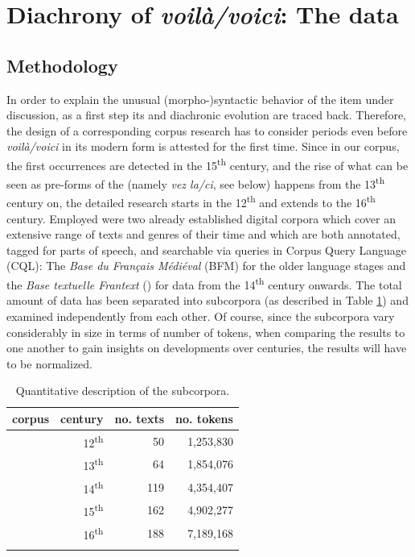 \documentclass[output=paper,colorlinks,citecolor=brown]{langscibook}
\begin{document}
\section{Diachrony of \emph{voilà/voici}: The data} \label{07sec2}

\subsection{Methodology}

In order to explain the unusual (morpho-)syntactic behavior of the item under discussion, as a first step its  and diachronic evolution are traced back. Therefore, the design of a corresponding corpus research has to consider periods even before \emph{voilà/voici} in its modern form is attested for the first time. Since in our corpus, the first occurrences are detected in the 15\textsuperscript{th} century, and the rise of what can be seen as pre-forms of the  (namely \emph{vez la/ci}, see below) happens from the 13\textsuperscript{th} century on, the detailed research starts in the 12\textsuperscript{th} and extends to the 16\textsuperscript{th} century. Employed were two already established digital corpora which cover an extensive range of texts and genres of their time and which are both annotated, tagged for parts of speech, and searchable via queries in Corpus Query Language (CQL): The \emph{Base du Français Médiéval} (BFM) for the older language stages and the \emph{Base textuelle Frantext} (\citeauthor{frantext}) for data from the 14\textsuperscript{th} century onwards. The total amount of data has been separated into subcorpora (as described in Table \ref{07tab1}) and examined independently from each other. Of course, since the subcorpora vary considerably in size in terms of number of tokens, when comparing the results to one another to gain insights on developments over centuries, the results will have to be normalized.

\begin{table}[ht]
	\centering
	\begin{tabularx}{0.6\textwidth}{Xrrr}
		\lsptoprule
			corpus\is{corpus linguistics} & century & no. texts & no. tokens \\
			\midrule
			\cite{bfm2019} & 12\textsuperscript{th} & 50 & 1,253,830 \\
			\cite{bfm2022} & 13\textsuperscript{th} & 64 & 1,854,076 \\
			\citeauthor{frantext} & 14\textsuperscript{th} & 119 & 4,354,407 \\
			& 15\textsuperscript{th} & 162 & 4,902,277 \\
			& 16\textsuperscript{th} & 188 & 7,189,168 \\
		\lspbottomrule
	\end{tabularx}
	\caption{Quantitative description of the subcorpora.}
	\label{07tab1}
\end{table}
\end{document}

